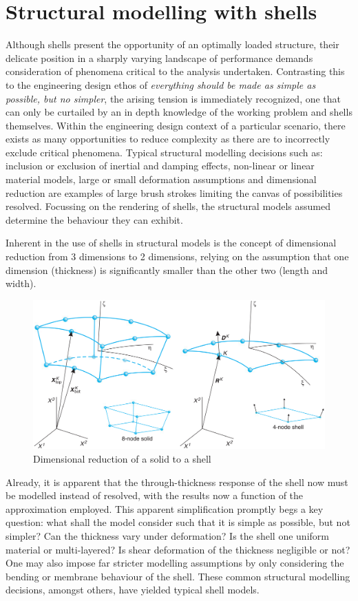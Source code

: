 \section{Structural modelling with shells}
Although shells present the opportunity of an optimally loaded structure, their delicate position in a sharply varying landscape of performance demands consideration of phenomena critical to the analysis undertaken. Contrasting this to the engineering design ethos of \textit{everything should be made as simple as possible, but no simpler}, the arising tension is immediately recognized, one that can only be curtailed by an in depth knowledge of the working problem and shells themselves. Within the engineering design context of a particular scenario, there exists as many opportunities to reduce complexity as there are to incorrectly exclude critical phenomena. Typical structural modelling decisions such as: inclusion or exclusion of inertial and damping effects, non-linear or linear material models, large or small deformation assumptions and dimensional reduction are examples of large brush strokes limiting the canvas of possibilities resolved. Focussing on the rendering of shells, the structural models assumed determine the behaviour they can exhibit.

Inherent in the use of shells in structural models is the concept of dimensional reduction from 3 dimensions to 2 dimensions, relying on the assumption that one dimension (thickness) is significantly smaller than the other two (length and width). 

\begin{figure}[H]
	\centering
	\def\svgwidth{\columnwidth}
	\includegraphics[width=12cm]{images/degenerateshell.png}
	\caption{Dimensional reduction of a solid to a shell \cite{BischLitBook04}}
	\label{shellModels}
\end{figure}

Already, it is apparent that the through-thickness response of the shell now must be modelled instead of resolved, with the results now a function of the approximation employed. This apparent simplification promptly begs a key question: what shall the model consider such that it is simple as possible, but not simpler? Can the thickness vary under deformation? Is the shell one uniform material or multi-layered? Is shear deformation of the thickness negligible or not? One may also impose far stricter modelling assumptions by only considering the bending or membrane behaviour of the shell. These common structural modelling decisions, amongst others, have yielded typical shell models.


